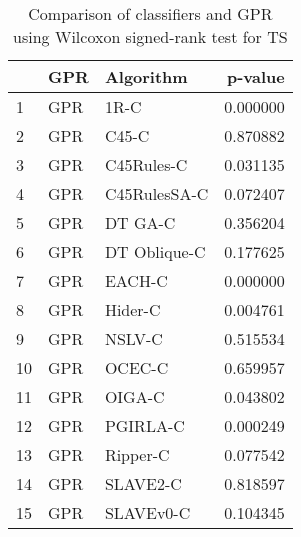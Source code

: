 \begin{table}
\footnotesize
\caption{Comparison of classifiers and GPR using Wilcoxon signed-rank test for TS}
\label{tab:GPR wilcoxon TS comparison}
\begin{tabular}{lllr}
\hline
 & GPR & Algorithm & p-value \\
\hline
1 & GPR & 1R-C & 0.000000 \\
2 & GPR & C45-C & 0.870882 \\
3 & GPR & C45Rules-C & 0.031135 \\
4 & GPR & C45RulesSA-C & 0.072407 \\
5 & GPR & DT GA-C & 0.356204 \\
6 & GPR & DT Oblique-C & 0.177625 \\
7 & GPR & EACH-C & 0.000000 \\
8 & GPR & Hider-C & 0.004761 \\
9 & GPR & NSLV-C & 0.515534 \\
10 & GPR & OCEC-C & 0.659957 \\
11 & GPR & OIGA-C & 0.043802 \\
12 & GPR & PGIRLA-C & 0.000249 \\
13 & GPR & Ripper-C & 0.077542 \\
14 & GPR & SLAVE2-C & 0.818597 \\
15 & GPR & SLAVEv0-C & 0.104345 \\
\hline
\end{tabular}
\end{table}
